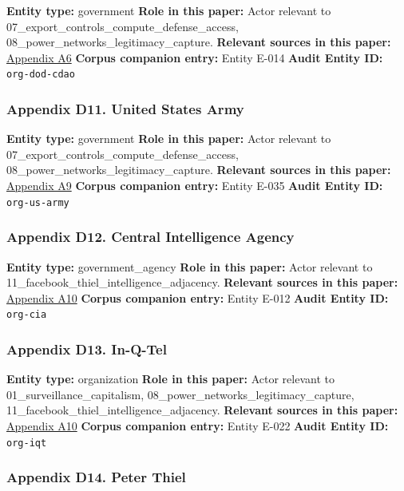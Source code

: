 \documentclass[
  american,
  11pt,
  letterpaper,
]{article}
\begin{document}
\textbf{Entity type:} government \textbf{Role in this paper:} Actor
relevant to 07\_export\_controls\_compute\_defense\_access,
08\_power\_networks\_legitimacy\_capture. \textbf{Relevant sources in
this paper:}
\hyperref[ch-07-appendix-a6-introducing-openai-for-government]{Appendix
A6} \textbf{Corpus companion entry:} Entity E-014 \textbf{Audit Entity
ID:} \texttt{org-dod-cdao}

\subsubsection{Appendix D11. United States
Army}\label{ch-07-appendix-d11-united-states-army}

\textbf{Entity type:} government \textbf{Role in this paper:} Actor
relevant to 07\_export\_controls\_compute\_defense\_access,
08\_power\_networks\_legitimacy\_capture. \textbf{Relevant sources in
this paper:}
\hyperref[ch-07-appendix-a9-army-launches-detachment-201-executive-innovation-corps-to-drive-tech-transformation]{Appendix
A9} \textbf{Corpus companion entry:} Entity E-035 \textbf{Audit Entity
ID:} \texttt{org-us-army}

\subsubsection{Appendix D12. Central Intelligence
Agency}\label{ch-07-appendix-d12-central-intelligence-agency}

\textbf{Entity type:} government\_agency \textbf{Role in this paper:}
Actor relevant to 11\_facebook\_thiel\_intelligence\_adjacency.
\textbf{Relevant sources in this paper:}
\hyperref[ch-07-appendix-a10-in-q-tel]{Appendix A10} \textbf{Corpus
companion entry:} Entity E-012 \textbf{Audit Entity ID:}
\texttt{org-cia}

\subsubsection{Appendix D13.
In-Q-Tel}\label{ch-07-appendix-d13-in-q-tel}

\textbf{Entity type:} organization \textbf{Role in this paper:} Actor
relevant to 01\_surveillance\_capitalism,
08\_power\_networks\_legitimacy\_capture,
11\_facebook\_thiel\_intelligence\_adjacency. \textbf{Relevant sources
in this paper:} \hyperref[ch-07-appendix-a10-in-q-tel]{Appendix A10}
\textbf{Corpus companion entry:} Entity E-022 \textbf{Audit Entity ID:}
\texttt{org-iqt}

\subsubsection{Appendix D14. Peter
Thiel}\label{ch-07-appendix-d14-peter-thiel}
\end{document}
